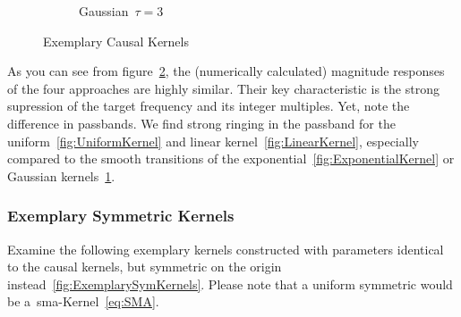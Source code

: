 \documentclass[a4paper]{article}
\begin{document}
\begin{figure}[hbtp]
\begin{subfigure}{.245\textwidth}
        \caption{Gaussian~$\tau=3$}\label{fig:GaussKernel}
    \end{subfigure}
    \caption{Exemplary Causal Kernels}\label{fig:ExemplaryCausalKernels}
\end{figure}

As you can see from figure~\ref{fig:ExemplaryCausalKernels}, the (numerically calculated) magnitude responses of the four approaches are highly similar. Their key characteristic is the strong supression of the target frequency and its integer multiples.
Yet, note the difference in passbands. We find strong ringing in the passband for the uniform~\ref{fig:UniformKernel} and linear kernel~\ref{fig:LinearKernel}, especially compared to the smooth transitions of the exponential~\ref{fig:ExponentialKernel} or Gaussian kernels~\ref{fig:GaussKernel}.


\subsubsection{Exemplary Symmetric Kernels}

Examine the following exemplary kernels constructed with parameters identical to the causal kernels, but symmetric on the origin instead~\ref{fig:ExemplarySymKernels}. Please note that a uniform symmetric would be a~\gls{sma}-Kernel~\eqref{eq:SMA}.
\end{document}

